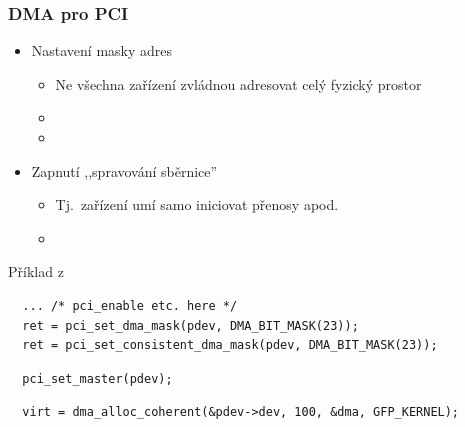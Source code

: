 \begin{frame}[fragile]
  \frametitle{DMA pro PCI}

  \begin{itemize}
    \item Nastavení masky adres
    \begin{itemize}
      \item Ne všechna zařízení zvládnou adresovat celý fyzický prostor
      \item {}
      \item {}
    \end{itemize}

    \pause

    \item Zapnutí ,,spravování sběrnice''
    \begin{itemize}
      \item Tj.\ zařízení umí samo iniciovat přenosy apod.
      \item {}
    \end{itemize}
  \end{itemize}


  \begin{block}{Příklad z }
    \begin{lstlisting}
  ... /* pci_enable etc. here */
  ret = pci_set_dma_mask(pdev, DMA_BIT_MASK(23));
  ret = pci_set_consistent_dma_mask(pdev, DMA_BIT_MASK(23));
    \end{lstlisting}
    \begin{lstlisting}
  pci_set_master(pdev);
    \end{lstlisting}
    \begin{lstlisting}
  virt = dma_alloc_coherent(&pdev->dev, 100, &dma, GFP_KERNEL);
    \end{lstlisting}
  \end{block}

\end{frame}

